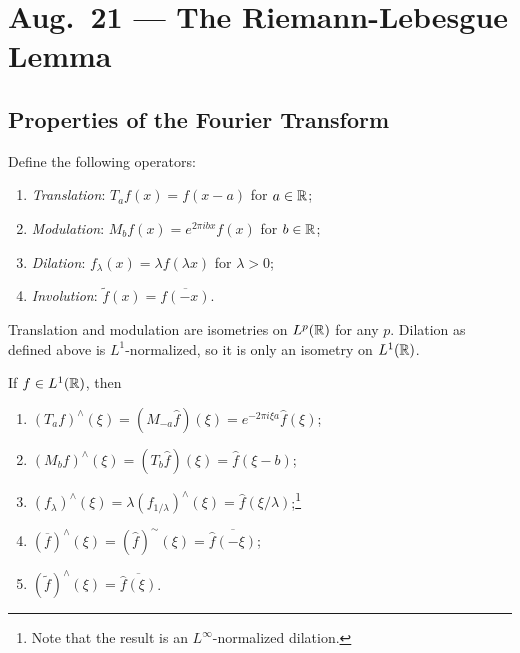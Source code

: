 \chapter{Aug.~21 --- The Riemann-Lebesgue Lemma}

\section{Properties of the Fourier Transform}

\begin{definition}
  Define the following operators:
  \begin{enumerate}
    \item \emph{Translation}:
      $T_a f(x) = f(x - a)$ for $a \in \mathbb{R}$;
    \item \emph{Modulation}:
      $M_b f(x) = e^{2\pi i b x} f(x)$
      for $b \in \mathbb{R}$;
    \item \emph{Dilation}:
      $f_{\lambda}(x) = \lambda f(\lambda x)$
      for $\lambda > 0$;
    \item \emph{Involution}:
      $\widetilde{f}(x) = \overline{f(-x)}$.
  \end{enumerate}
\end{definition}

\begin{remark}
  Translation and modulation are
  isometries on $L^p(\mathbb{R})$ for any $p$.
  Dilation
  as defined above is $L^1$-normalized, so
  it is only an isometry on $L^1(\mathbb{R})$.
\end{remark}

\begin{exercise}
  If $f \in L^1(\mathbb{R})$, then
  \begin{enumerate}
    \item $(T_a f)^\wedge(\xi) = (M_{-a} \widehat{f})(\xi) = e^{-2\pi i \xi a} \widehat{f}(\xi)$;
    \item $(M_b f)^\wedge(\xi) = (T_b \widehat{f})(\xi) = \widehat{f}(\xi - b)$;
    \item $(f_\lambda)^\wedge(\xi) = \lambda (f_{1 / \lambda})^\wedge(\xi) = \widehat{f}(\xi / \lambda)$;\footnote{Note that the result is an $L^\infty$-normalized dilation.}
    \item $(\overline{f})^\wedge(\xi) = (\widehat{f})^{\sim}(\xi) = \overline{\widehat{f}(-\xi)}$;
    \item $(\widetilde{f})^\wedge(\xi) = \overline{\widehat{f}(\xi)}$.
  \end{enumerate}
\end{exercise}

